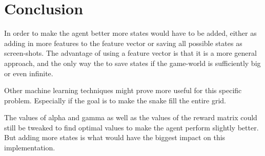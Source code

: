\documentclass[fleqn,10pt]{SelfArx} %
\begin{document}
\section{Conclusion}
In order to make the agent better more states would have to be added, either as adding in more features to the feature vector or saving all possible states as screen-shots. The advantage of using a feature vector is that it is a more general approach, and the only way the to save states if the game-world is sufficiently big or even infinite. 

Other machine learning techniques might prove more useful for this specific problem. Especially if  the goal is to make the snake fill the entire grid. 

The values of alpha and gamma as well as the values of the reward matrix could still be tweaked to find optimal values to make the agent perform slightly better. But adding more states is what would have the biggest impact on this implementation.





\end{document}
